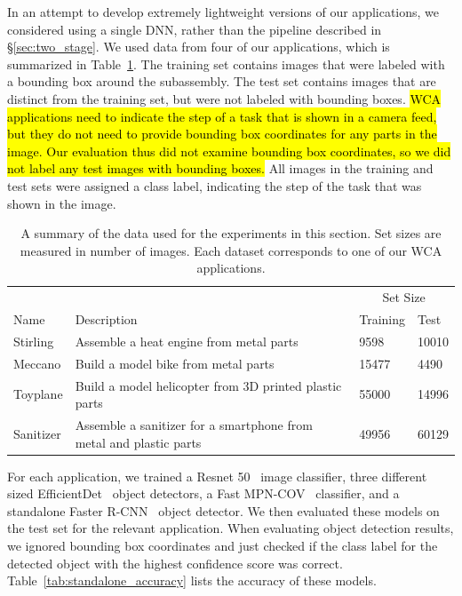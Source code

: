 In an attempt to develop extremely lightweight versions of our applications,
we considered using a single DNN, rather than the pipeline described in
\S\ref{sec:two_stage}.
We used data from four of our applications, which is summarized in
Table~\ref{tab:dataset_size}.
The training set contains images that were labeled with a bounding box around
the subassembly.
The test set contains images that are distinct from the training set, but were
not labeled with bounding boxes.
\hl{
  WCA applications need to indicate the step of a task that is shown in a camera
  feed, but they do not need to provide bounding box coordinates for any parts
  in the image.
  Our evaluation thus did not examine bounding box coordinates, so we did not
  label any test images with bounding boxes.
}
All images in the training and test sets were assigned a class label, indicating
the step of the task that was shown in the image.

\begin{table}
\begin{tabular}{|l||p{10.5cm}|l|l|}
  \hline
  & & \multicolumn{2}{c|}{Set Size}\\
  Name & Description & Training & Test \\
  \hline
  \hline
  Stirling & Assemble a heat engine from metal parts & 9598 & 10010\\
  Meccano & Build a model bike from metal parts & 15477 & 4490\\
  Toyplane & Build a model helicopter from 3D printed plastic parts & 55000 & 14996\\
  Sanitizer & Assemble a sanitizer for a smartphone from metal and plastic parts & 49956 & 60129\\
  \hline
\end{tabular}
  \caption{
    A summary of the data used for the experiments in this section.
    Set sizes are measured in number of images.
    Each dataset corresponds to one of our WCA applications.
  }\label{tab:dataset_size}
\end{table}

For each application, we trained a Resnet 50~\cite{He2016} image classifier,
three different sized EfficientDet~\cite{Tan2020} object detectors, a
Fast MPN-COV~\cite{Li_2018_CVPR} classifier, and a standalone Faster
R-CNN~\cite{frcnn} object detector.
We then evaluated these models on the test set for the relevant application.
When evaluating object detection results, we ignored bounding box coordinates
and just checked if the class label for the detected object with the highest
confidence score was correct.
Table~\ref{tab:standalone_accuracy} lists the accuracy of these models.

